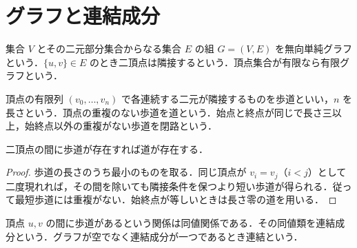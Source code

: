 \section{グラフと連結成分}
\begin{defn}[無向単純グラフ]
集合 $V$ とその二元部分集合からなる集合 $E$ の組 $G=(V,E)$ を無向単純グラフという．$\{u,v\}\in E$ のとき二頂点は隣接するという．頂点集合が有限なら有限グラフという．
\end{defn}
\begin{defn}[歩道と道]
頂点の有限列 $(v_0,\ldots,v_n)$ で各連続する二元が隣接するものを歩道といい，$n$ を長さという．頂点の重複のない歩道を道という．始点と終点が同じで長さ三以上，始終点以外の重複がない歩道を閉路という．
\end{defn}
\begin{prop}[歩道から道への簡約]
二頂点の間に歩道が存在すれば道が存在する．
\end{prop}
\begin{proof}
歩道の長さのうち最小のものを取る．同じ頂点が $v_i=v_j$（$i<j$）として二度現れれば，その間を除いても隣接条件を保つより短い歩道が得られる．従って最短歩道には重複がない．始終点が等しいときは長さ零の道を用いる．
\end{proof}
\begin{prop}[連結成分による分割]
頂点 $u,v$ の間に歩道があるという関係は同値関係である．その同値類を連結成分という．グラフが空でなく連結成分が一つであるとき連結という．
\end{prop}
